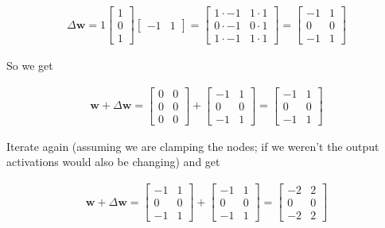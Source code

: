 \begin{align*}
\Delta \mathbf{w}  = 1
\begin{bmatrix} 1 \\ 0 \\ 1 \end{bmatrix} 
\begin{bmatrix} -1 & 1 \end{bmatrix} 
= \begin{bmatrix} 1 \cdot -1 & 1 \cdot 1 \\ 0 \cdot -1 & 0 \cdot 1 \\ 1 \cdot -1 & 1 \cdot 1 \end{bmatrix} 
= \begin{bmatrix} -1 & 1 \\ 0 & 0 \\  -1 & 1  \end{bmatrix}
\end{align*}

So we get

\begin{align*}
\mathbf{w} + \Delta \mathbf{w}  =
\begin{bmatrix} 0 & 0 \\ 0 & 0 \\  0  & 0  \end{bmatrix} +
\begin{bmatrix} -1 & 1 \\ 0 & 0 \\  -1 & 1  \end{bmatrix} =
\begin{bmatrix} -1 & 1 \\ 0 & 0 \\  -1 & 1  \end{bmatrix}
\end{align*}

Iterate again (assuming we are clamping the nodes; if we weren't the output activations would also be changing) and get


\begin{align*}
\mathbf{w} + \Delta \mathbf{w}  =
\begin{bmatrix} -1 & 1 \\ 0 & 0 \\  -1 & 1  \end{bmatrix} +
\begin{bmatrix} -1 & 1 \\ 0 & 0 \\  -1 & 1  \end{bmatrix} =
\begin{bmatrix} -2 & 2 \\ 0 & 0 \\  -2 & 2  \end{bmatrix}
\end{align*}

